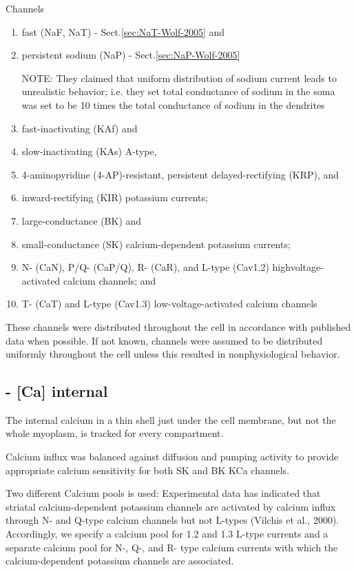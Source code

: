 Channels
\begin{enumerate}
  \item  fast (NaF, NaT) - Sect.\ref{sec:NaT-Wolf-2005} and 
  
  
  \item persistent sodium (NaP) - Sect.\ref{sec:NaP-Wolf-2005}

NOTE: They claimed that uniform distribution of sodium current leads to
unrealistic behavior; i.e. they set total conductance of sodium in the soma was
set to be 10 times the total conductance of sodium in the dendrites

  
  \item fast-inactivating (KAf) and 
  \item slow-inactivating (KAs) A-type,
  
  \item 4-aminopyridine (4-AP)-resistant, persistent delayed-rectifying (KRP), and 
  
  \item inward-rectifying (KIR) potassium currents; 
  
  \item large-conductance (BK) and 
  \item small-conductance (SK) calcium-dependent
  potassium currents; 
  
  \item N- (CaN), P/Q- (CaP/Q), R- (CaR), and L-type (Cav1.2) highvoltage-
activated calcium channels; and 
  \item T- (CaT) and L-type (Cav1.3) low-voltage-activated calcium channels
\end{enumerate}
These channels
were distributed throughout the cell in accordance with published data
when possible. If not known, channels were assumed to be distributed
uniformly throughout the cell unless this resulted in nonphysiological
behavior.

\subsection{- [Ca] internal}

The internal calcium in a thin shell just under the cell membrane, but not
the whole myoplasm, is tracked for every compartment. 

Calcium influx was balanced against diffusion and pumping activity to provide
appropriate calcium sensitivity for both SK and BK KCa channels.

Two different Calcium pools is used:
Experimental data has indicated that striatal calcium-dependent potassium
channels are activated by calcium influx through N- and Q-type calcium channels
but not L-types (Vilchis et al., 2000). Accordingly, we specify a calcium pool
for 1.2 and 1.3 L-type currents and a separate calcium pool for N-, Q-, and R-
type calcium currents with which the calcium-dependent potassium channels are
associated.

